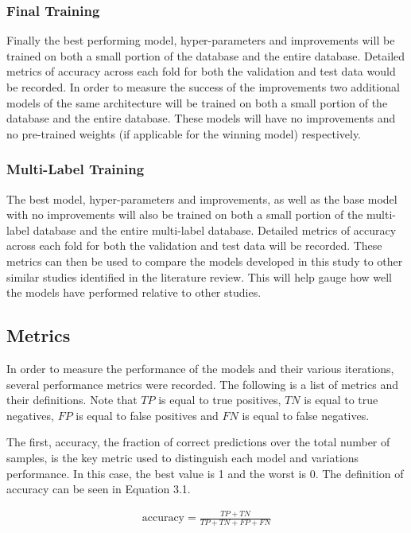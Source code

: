 \subsubsection{Final Training}
Finally the best performing model, hyper-parameters and improvements will be trained on both a small portion of the database and the entire database. Detailed metrics of accuracy across each fold for both the validation and test data would be recorded. In order to measure the success of the improvements two additional models of the same architecture will be trained on both a small portion of the database and the entire database. These models will have no improvements and no pre-trained weights (if applicable for the winning model) respectively.

\subsubsection{Multi-Label Training}
The best model, hyper-parameters and improvements, as well as the base model with no improvements will also be trained on both a small portion of the multi-label database and the entire multi-label database. Detailed metrics of accuracy across each fold for both the validation and test data will be recorded. These metrics can then be used to compare the models developed in this study to other similar studies identified in the literature review. This will help gauge how well the models have performed relative to other studies.

\subsection{Metrics}
In order to measure the performance of the models and their various iterations, several performance metrics were recorded. The following is a list of metrics and their definitions. Note that $TP$ is equal to true positives, $TN$ is equal to true negatives, $FP$ is equal to false positives and $FN$ is equal to false negatives.

The first, accuracy, the fraction of correct predictions over the total number of samples, is the key metric used to distinguish each model and variations performance. In this case, the best value is 1 and the worst is 0. The definition of accuracy can be seen in Equation 3.1.

\begin{align}
\text{accuracy}= \frac{TP+TN}{TP+TN+FP+FN}
\end{align}

